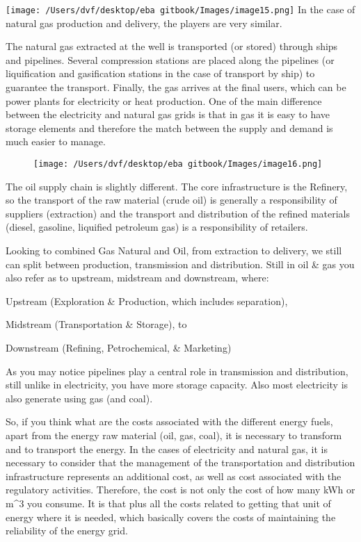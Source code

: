 \documentclass[]{book}
\theoremstyle{definition}
\theoremstyle{definition}
\theoremstyle{definition}
\theoremstyle{remark}
\begin{document}
\texttt{[image: /Users/dvf/desktop/eba gitbook/Images/image15.png]}
In the case of natural gas production and delivery, the players are very
similar.

The natural gas extracted at the well is transported (or stored) through
ships and pipelines. Several compression stations are placed along the
pipelines (or liquification and gasification stations in the case of
transport by ship) to guarantee the transport. Finally, the gas arrives
at the final users, which can be power plants for electricity or heat
production. One of the main difference between the electricity and
natural gas grids is that in gas it is easy to have storage elements and
therefore the match between the supply and demand is much easier to
manage.

\begin{figure}[htbp]
\centering
\texttt{[image: /Users/dvf/desktop/eba gitbook/Images/image16.png]}
\caption{}
\end{figure}

The oil supply chain is slightly different. The core infrastructure is
the Refinery, so the transport of the raw material (crude oil) is
generally a responsibility of suppliers (extraction) and the transport
and distribution of the refined materials (diesel, gasoline, liquified
petroleum gas) is a responsibility of retailers.

Looking to combined Gas Natural and Oil, from extraction to delivery, we
still can split between production, transmission and distribution. Still
in oil \& gas you also refer as to upstream, midstream and downstream,
where:

Upstream (Exploration \& Production, which includes separation),

Midstream (Transportation \& Storage), to

Downstream (Refining, Petrochemical, \& Marketing)

As you may notice pipelines play a central role in transmission and
distribution, still unlike in electricity, you have more storage
capacity. Also most electricity is also generate using gas (and coal).

So, if you think what are the costs associated with the different energy
fuels, apart from the energy raw material (oil, gas, coal), it is
necessary to transform and to transport the energy. In the cases of
electricity and natural gas, it is necessary to consider that the
management of the transportation and distribution infrastructure
represents an additional cost, as well as cost associated with the
regulatory activities. Therefore, the cost is not only the cost of how
many kWh or m\^{}3 you consume. It is that plus all the costs related to
getting that unit of energy where it is needed, which basically covers
the costs of maintaining the reliability of the energy grid.
\end{document}
